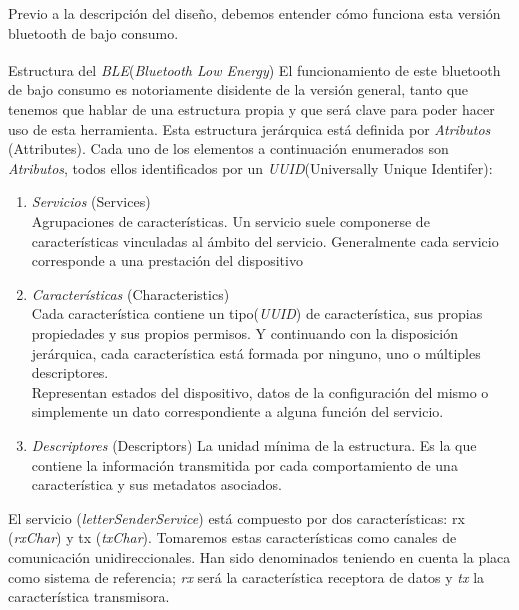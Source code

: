 Previo a la descripción del diseño, debemos entender cómo funciona esta versión
bluetooth de bajo consumo.

\begin{teoria}{Estructura del \textit{BLE}(\textit{Bluetooth Low Energy})\textsuperscript{\cite{BLEAndroid}\cite{BLEguide}\cite{BLEOreilly}}}
    \color{mitexto}
    El funcionamiento de este bluetooth de bajo consumo es notoriamente
    disidente de la versión general, tanto que tenemos que hablar de una
    estructura propia y que será clave para poder hacer uso de esta
    herramienta.
    Esta estructura jerárquica está definida por \textit{\textit{Atributos}}
    {\footnotesize(Attributes)}.
    Cada uno de los elementos a continuación enumerados son
    \textit{\textit{Atributos}}, todos ellos identificados por un
    \textit{\textit{UUID}}{\footnotesize(Universally Unique Identifer)}:
    \begin{enumerate}
        \itemsep0em 
        \item \textit{\textit{Servicios}} {\footnotesize(Services)}\\
        {\small Agrupaciones de características. Un servicio suele
        componerse de características vinculadas al ámbito del servicio.
        Generalmente cada servicio corresponde a una prestación del
        dispositivo}
        \item \textit{\textit{Características}} {\footnotesize(Characteristics)}\\
        {\small Cada característica contiene un tipo(\textit{\textit{UUID}})
        de característica, sus propias propiedades y sus
        propios permisos. Y continuando con
        la disposición jerárquica, cada característica está formada
        por ninguno, uno o múltiples descriptores.\\
        Representan estados del dispositivo, datos de la configuración
        del mismo o simplemente un dato correspondiente a alguna
        función del servicio.}
        \item \textit{\textit{Descriptores}} {\footnotesize(Descriptors)}
        {\small La unidad mínima de la estructura. Es la que contiene
        la información transmitida por cada comportamiento de una
        característica y sus metadatos asociados.}
    \end{enumerate}
\end{teoria}

El servicio (\textit{letterSenderService}) está compuesto por dos características:
rx (\textit{rxChar}) y tx (\textit{txChar}). Tomaremos estas características
como canales de comunicación unidireccionales. Han sido denominados teniendo
en cuenta la placa como
sistema de referencia; \textit{rx} será la característica receptora de datos y 
\textit{tx} la característica transmisora.

